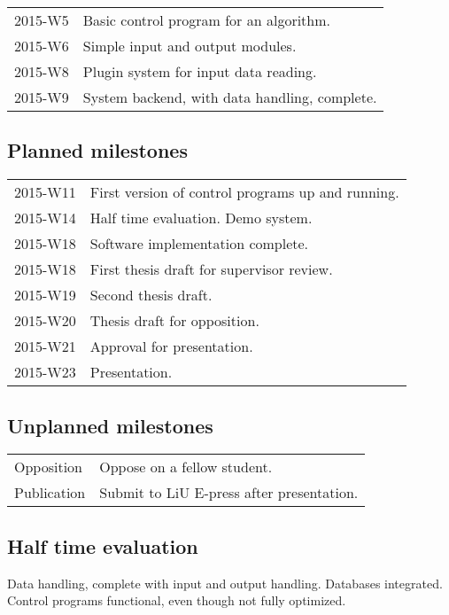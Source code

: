 \documentclass[11pt]{article}
\begin{document}
\begin{tabular}{l l}
    2015-W5     & Basic control program for an algorithm.  \\
    2015-W6     & Simple input and output modules.  \\
    2015-W8     & Plugin system for input data reading.  \\
    2015-W9     & System backend, with data handling, complete.  \\
\end{tabular}

\subsection*{Planned milestones}

\begin{tabular}{l l}
    2015-W11    & First version of control programs up and running. \\
    2015-W14    & Half time evaluation. Demo system. \\
    2015-W18    & Software implementation complete. \\
    2015-W18    & First thesis draft for supervisor review. \\
    2015-W19    & Second thesis draft. \\
    2015-W20    & Thesis draft for opposition. \\
    2015-W21    & Approval for presentation. \\
    2015-W23    & Presentation. \\
\end{tabular}

\subsection*{Unplanned milestones}

\begin{tabular}{l l}
    Opposition  & Oppose on a fellow student. \\
    Publication  & Submit to LiU E-press after presentation. \\
\end{tabular}

\subsection*{Half time evaluation}

Data handling, complete with input and output handling. Databases integrated. Control programs functional, even though not fully optimized.
\end{document}

